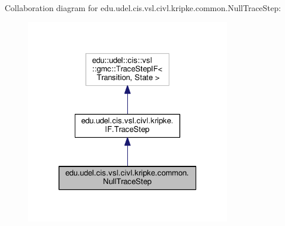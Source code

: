 Collaboration diagram for edu.\+udel.\+cis.\+vsl.\+civl.\+kripke.\+common.\+Null\+Trace\+Step\+:
\nopagebreak
\begin{figure}[H]
\begin{center}
\leavevmode
\includegraphics[width=256pt]{classedu_1_1udel_1_1cis_1_1vsl_1_1civl_1_1kripke_1_1common_1_1NullTraceStep__coll__graph}
\end{center}
\end{figure}
